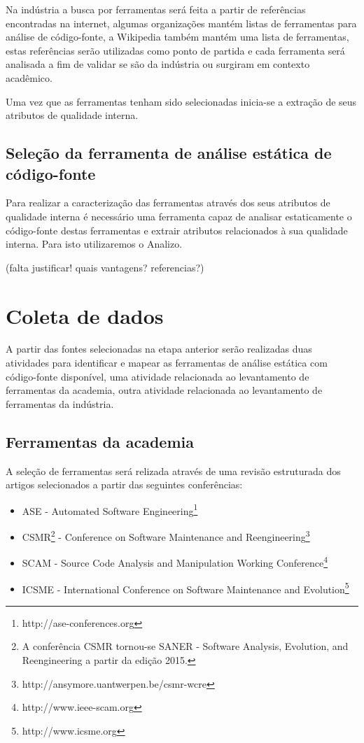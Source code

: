 \documentclass[qual, classic, a4paper]{ufbathesis}
\begin{document}
Na indústria a busca por ferramentas será feita a partir
de referências encontradas na internet, algumas organizações mantém listas de
ferramentas para análise de código-fonte, a Wikipedia também mantém uma lista
de ferramentas, estas referências serão utilizadas como ponto de partida e
cada ferramenta será analisada a fim de validar se são da indústria ou
surgiram em contexto acadêmico.

Uma vez que as ferramentas tenham sido selecionadas inicia-se a extração de
seus atributos de qualidade interna.

\subsection{Seleção da ferramenta de análise estática de código-fonte}

Para realizar a caracterização das ferramentas através dos seus atributos de
qualidade interna é necessário uma ferramenta capaz de analisar estaticamente
o código-fonte destas ferramentas e extrair atributos relacionados à sua
qualidade interna. Para isto utilizaremos o Analizo\cite{Terceiro2010}.

(falta justificar! quais vantagens? referencias?)

\section{Coleta de dados}

A partir das fontes selecionadas na etapa anterior serão realizadas duas
atividades para identificar e mapear as ferramentas de análise estática com
código-fonte disponível, uma atividade relacionada ao levantamento de
ferramentas da academia, outra atividade relacionada ao levantamento de
ferramentas da indústria.

\subsection{Ferramentas da academia}

A seleção de ferramentas será relizada através de uma revisão estruturada dos
artigos selecionados a partir das seguintes conferências:

\begin{itemize}
  \item ASE - Automated Software
    Engineering\footnote{http://ase-conferences.org}
  \item CSMR\footnote{A conferência CSMR tornou-se SANER - Software Analysis,
    Evolution, and Reengineering a partir da edição 2015.} - Conference on
    Software Maintenance and
    Reengineering\footnote{http://ansymore.uantwerpen.be/csmr-wcre}
  \item SCAM - Source Code Analysis and Manipulation Working
    Conference\footnote{http://www.ieee-scam.org}
  \item ICSME - International Conference on Software Maintenance and
    Evolution\footnote{http://www.icsme.org}
\end{itemize}
\end{document}

